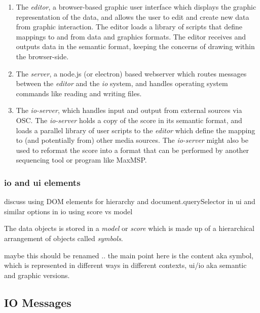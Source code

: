 \documentclass{article}
\begin{document}
\begin{enumerate}\itemsep0pt
\item The \textit{editor}, a browser-based graphic user interface which displays the graphic representation of the data, and allows the user to edit and create new data from graphic interaction. The editor loads a library of scripts that define mappings to and from data and graphics formats. The editor receives and outputs data in the semantic format, keeping the concerns of drawing within the browser-side.

\item The \textit{server}, a node.js (or electron) based webserver which routes messages between the \textit{editor} and the \textit{io} system, and handles operating system commands like reading and writing files.

\item  The \textit{io-server}, which handles input and output from external sources via OSC. The \textit{io-server} holds a copy of the score in its semantic format, and loads a parallel library of user scripts to the \textit{editor} which define the mapping to (and potentially from) other media sources. The \textit{io-server} might also be used to reformat the score into a format that can be performed by another sequencing tool or program like MaxMSP.
\end{enumerate}



\subsubsection{io and ui elements}\label{subsec:io_ui_elements}

discuss using DOM elements for hierarchy and document.querySelector in ui
and similar options in io using score vs model


The data objects is stored in a \textit{model} or \textit{score} which is made up of a hierarchical arrangement of objects called \textit{symbols}.


maybe this should be renamed ..
the main point here is the content aka symbol, which is represented in different ways in different contexts, ui/io aka semantic and graphic versions.


\subsection{IO Messages}\label{subsec:io_messages}
\end{document}
